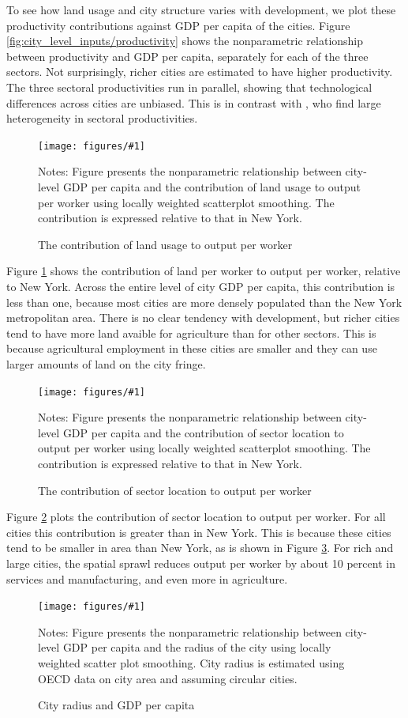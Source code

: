 \documentclass[12pt]{article}
\newcommand{\dofigure}[3]{\begin{figure}
\begin{centering}
\texttt{[image: figures/\#1]}
  \caption{#2\label{fig:#1}}
\end{centering}

\noindent \footnotesize{#3}
\end{figure}}
\begin{document}
To see how land usage and city structure varies with development, we plot these productivity contributions against GDP per capita of the cities. Figure \ref{fig:city_level_inputs/productivity} shows the nonparametric relationship between productivity and GDP per capita, separately for each of the three sectors. Not surprisingly, richer cities are estimated to have higher productivity. The three sectoral productivities run in parallel, showing that technological differences across cities are unbiased. This is in contrast with , who find large heterogeneity in sectoral productivities.

\dofigure{city_level_inputs/land}{The contribution of land usage to output per worker}{Notes: Figure presents the nonparametric relationship between city-level GDP per capita and the contribution of land usage to output per worker using locally weighted scatterplot smoothing. The contribution is expressed relative to that in New York.}

Figure \ref{fig:city_level_inputs/land} shows the contribution of land per worker to output per worker, relative to New York. Across the entire level of city GDP per capita, this contribution is less than one, because most cities are more densely populated than the New York metropolitan area. There is no clear tendency with development, but richer cities tend to have more land avaible for agriculture than for other sectors. This is because agricultural employment in these cities are smaller and they can use larger amounts of land on the city fringe.

\dofigure{city_level_inputs/location}{The contribution of sector location to output per worker}{Notes: Figure presents the nonparametric relationship between city-level GDP per capita and the contribution of sector location to output per worker using locally weighted scatterplot smoothing. The contribution is expressed relative to that in New York.}

Figure \ref{fig:city_level_inputs/location} plots the contribution of sector location to output per worker. For all cities this contribution is greater than in New York. This is because these cities tend to be smaller in area than New York, as is shown in Figure \ref{fig:city_level_inputs/city_radius}. For rich and large cities, the spatial sprawl reduces output per worker by about 10 percent in services and manufacturing, and even more in agriculture.

\dofigure{city_level_inputs/city_radius}{City radius and GDP per capita}{Notes: Figure presents the nonparametric relationship between city-level GDP per capita and the radius of the city using locally weighted scatter plot smoothing. City radius is estimated using OECD data on city area and assuming circular cities.}
\end{document}
